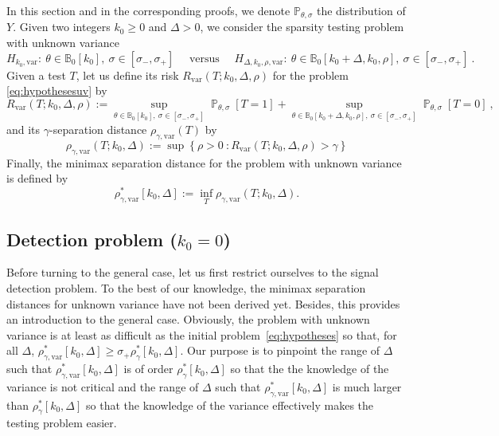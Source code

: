 \documentclass[twoside,11pt]{article}
\def\beq{\begin{equation}}
\def\eeq{\end{equation}}
\def\bbB{\mathbb{B}}
\renewcommand{\P}{\operatorname{\mathbb{P}}}
\newcommand{\<}{\langle}
\renewcommand{\>}{\rangle}
\begin{document}
In this section and in the corresponding proofs, we denote $\mathbb{P}_{\theta,\sigma}$ the distribution of $Y$. Given two integers $k_0\geq 0$ and $\Delta>0$, we consider the sparsity testing problem with unknown variance
\beq\label{eq:hypothesesuv}
 H_{k_0,\mathrm{var}}: \ \theta\in \bbB_0[k_0],\ \sigma \in [\sigma_-, \sigma_+]\quad \text{ versus }\quad  H_{\Delta,k_0,\rho,\mathrm{var}}:\ \theta \in \bbB_0[k_0+\Delta,k_0,\rho],\  \sigma \in [\sigma_-, \sigma_+]\ .
\eeq
Given a test $T$, let us define its risk $R_{\mathrm{var}}(T;k_0,\Delta, \rho)$ for the problem \eqref{eq:hypothesesuv} by
\beq\label{eq:riskuv}
R_{\mathrm{var}}(T;k_0,\Delta, \rho):= \sup_{\theta \in \bbB_0[k_0],\ \sigma \in [\sigma_-, \sigma_+]}\P_{\theta,\sigma}[T=1] +  \sup_{\theta \in \bbB_0[k_0+\Delta,k_0,\rho],\ \sigma \in [\sigma_-, \sigma_+]}\P_{\theta,\sigma}[T=0]\ ,
\eeq
and its $\gamma$-separation distance $\rho_{\gamma,\mathrm{var}}(T)$ by
\beq\label{eq:separationuv}
\rho_{\gamma,\mathrm{var}}(T;k_0,\Delta):= \sup \left\{\rho>0\ : R_{\mathrm{var}}(T;k_0,\Delta,\rho)>\gamma\right\}
\eeq
Finally, the minimax separation distance for the problem with unknown variance is defined by  
\beq\label{eq:separationuvminmax}
\rho^{*}_{\gamma,\mathrm{var}}[k_0,\Delta]:= \inf_{T}\rho_{\gamma,\mathrm{var}}(T;k_0,\Delta).
\eeq



\subsection{Detection problem ($k_0=0$)}\label{ss:sd}


Before turning to the general case, let us first restrict ourselves to the signal detection problem. To the best of our knowledge, the minimax separation distances for unknown variance have not been derived yet. Besides, this provides an introduction to the general case. Obviously, the problem with unknown variance is at least as difficult as the initial problem~\eqref{eq:hypotheses} so that, for all $\Delta$,  $\rho^{*}_{\gamma,\mathrm{var}}[k_0,\Delta]\geq \sigma_+ \rho^{*}_{\gamma}[k_0,\Delta]$. Our purpose is to pinpoint the range of $\Delta$ such that $\rho^{*}_{\gamma,\mathrm{var}}[k_0,\Delta]$ is of order $\rho^{*}_{\gamma}[k_0,\Delta]$ so that the the knowledge of the variance is not critical and the range of $\Delta$ such that $\rho^{*}_{\gamma,\mathrm{var}}[k_0,\Delta]$ is much larger than $\rho^{*}_{\gamma}[k_0,\Delta]$ so that the knowledge of the variance effectively makes the testing problem easier. 
\end{document}

